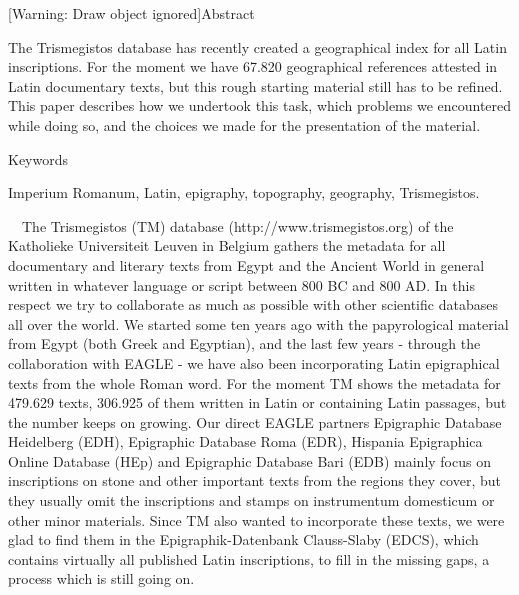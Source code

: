 \documentclass[amsthm,ebook]{saparticle}
\title{}
\author{Herbert Verreth}
\date{2015-11-15}
\begin{document}
[Warning: Draw object ignored]Abstract

The Trismegistos database has recently created a geographical index for all Latin inscriptions. For the moment we have
67.820 geographical references attested in Latin documentary texts, but this rough starting material still has to be
refined. This paper describes how we undertook this task, which problems we encountered while doing so, and the choices
we made for the presentation of the material.

Keywords

Imperium Romanum, Latin, epigraphy, topography, geography, Trismegistos.


\bigskip

\ \ The Trismegistos (TM) database (http://www.trismegistos.org) of the Katholieke Universiteit Leuven in Belgium
gathers the metadata for all documentary and literary texts from Egypt and the Ancient World in general written in
whatever language or script between 800 BC and 800 AD. In this respect we try to collaborate as much as possible with
other scientific databases all over the world. We started some ten years ago with the papyrological material from Egypt
(both Greek and Egyptian), and the last few years - through the collaboration with EAGLE - we have also been
incorporating Latin epigraphical texts from the whole Roman word. For the moment TM shows the metadata for 479.629
texts, 306.925 of them written in Latin or containing Latin passages, but the number keeps on growing. Our direct EAGLE
partners Epigraphic Database Heidelberg (EDH), Epigraphic Database Roma (EDR), Hispania Epigraphica Online Database
(HEp) and Epigraphic Database Bari (EDB) mainly focus on inscriptions on stone and other important texts from the
regions they cover, but they usually omit the inscriptions and stamps on instrumentum domesticum or other minor
materials. Since TM also wanted to incorporate these texts, we were glad to find them in the Epigraphik-Datenbank
Clauss-Slaby (EDCS), which contains virtually all published Latin inscriptions, to fill in the missing gaps, a process
which is still going on.
\end{document}

